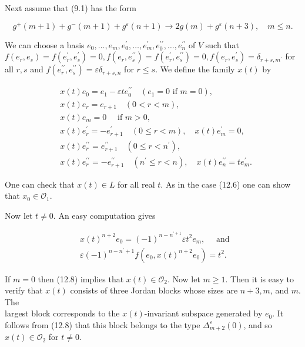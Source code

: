 \documentclass[10pt]{article}
\begin{document}
Next assume that (9.1) has the form


\begin{equation*}
g^{+}(m+1)+g^{-}(m+1)+g^{\varepsilon}(n+1) \rightarrow 2 g(m)+g^{\varepsilon}(n+3), \quad m \leqslant n . \tag{12.7}
\end{equation*}


We can choose a basis $e_{0}, \ldots, e_{m}, e_{0}^{\prime}, \ldots, e_{m}^{\prime}, e_{0}^{\prime \prime}, \ldots, e_{n}^{\prime \prime}$ of $V$ such that $f\left(e_{r}, e_{s}\right)=f\left(e_{r}^{\prime}, e_{s}^{\prime}\right)=0, f\left(e_{r}, e_{s}^{\prime \prime}\right)=f\left(e_{r}^{\prime}, e_{s}^{\prime \prime}\right)=0, f\left(e_{r}, e_{s}^{\prime}\right)=\delta_{r+s, m^{\prime}}$ for all $r, s$ and $f\left(e_{r}^{\prime \prime}, e_{s}^{\prime \prime}\right)=\varepsilon \delta_{r+s, n}$ for $r \leqslant s$. We define the family $x(t)$ by

$$
\begin{aligned}
& x(t) e_{0}=e_{1}-\varepsilon t e_{0}^{\prime \prime} \quad\left(e_{1}=0 \text { if } m=0\right), \\
& x(t) e_{r}=e_{r+1} \quad(0<r<m), \\
& x(t) e_{m}=0 \quad \text { if } m>0, \\
& x(t) e_{r}^{\prime}=-e_{r+1}^{\prime} \quad(0 \leqslant r<m), \quad x(t) e_{m}^{\prime}=0, \\
& x(t) e_{r}^{\prime \prime}=e_{r+1}^{\prime \prime} \quad\left(0 \leqslant r<n^{\prime}\right), \\
& x(t) e_{r}^{\prime \prime}=-e_{r+1}^{\prime \prime} \quad\left(n^{\prime} \leqslant r<n\right), \quad x(t) e_{n}^{\prime \prime}=t e_{m}^{\prime} .
\end{aligned}
$$

One can check that $x(t) \in L$ for all real $t$. As in the case (12.6) one can show that $x_{0} \in \mathcal{O}_{1}$.

Now let $t \neq 0$. An easy computation gives


\begin{align*}
& x(t)^{n+2} e_{0}=(-1)^{n-n^{\prime+1}} \varepsilon t^{2} e_{m}, \quad \text { and } \\
& \varepsilon(-1)^{n-n^{\prime}+1} f\left(e_{0}, x(t)^{n+2} e_{0}\right)=t^{2} . \tag{12.8}
\end{align*}


If $m=0$ then (12.8) implies that $x(t) \in \mathcal{O}_{2}$. Now let $m \geqslant 1$. Then it is easy to verify that $x(t)$ consists of three Jordan blocks whose sizes are $n+3, m$, and $m$. The\\
largest block corresponds to the $x(t)$-invariant subspace generated by $e_{0}$. It follows from (12.8) that this block belongs to the type $\Delta_{m+2}^{\varepsilon}(0)$, and so $x(t) \in \mathcal{O}_{2}$ for $t \neq 0$.
\end{document}
